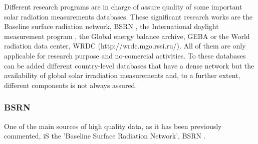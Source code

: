 Different research programs are in charge of assure quality of some important solar radiation measurements databases. These significant research works are the Baseline surface radiation network, BSRN \cite*{Konig-Langlo2013}, the International daylight measurement program \cite*{dumortier1999status}, the Global energy balance archive, GEBA \cite*{Gilgen1998} or the World radiation data center, WRDC (http://wrdc.mgo.rssi.ru/). All of them are only applicable for research purpose and no-comercial activities. To these databases can be added different country-level databases that have a dense network but the availability of global solar irradiation measurements and, to a further extent, different components is not always assured.


\subsubsection{BSRN}

One of the main sources of high quality data, as it has been previously commented, iS the 'Baseline Surface Radiation Network', BSRN \cite*{Konig-Langlo2013}. %

